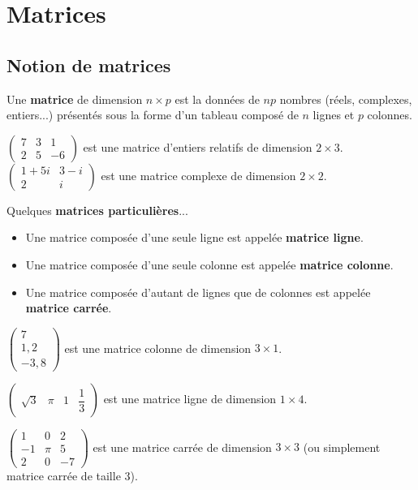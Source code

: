 \documentclass[11pt,fleqn]{book} %
\begin{document}
\chapter*{Matrices}

\section{Notion de matrices}

\begin{definition}Une \textbf{matrice} de dimension $n \times p$ est la données de $np$ nombres (réels, complexes, entiers...) présentés sous la forme d'un tableau composé de $n$ lignes et $p$ colonnes.\end{definition}

\begin{example} $\begin{pmatrix}7 & 3 & 1 \\ 2 & 5 &-6\end{pmatrix}$ est une matrice d'entiers relatifs de dimension $2 \times 3$. \\
$\begin{pmatrix}1+5i & 3-i \\ 2 & i \end{pmatrix}$ est une matrice complexe de dimension $2 \times 2$.\end{example}

\begin{definition}Quelques \textbf{matrices particulières}...

\begin{itemize}
\item Une matrice composée d'une seule ligne est appelée \textbf{matrice ligne}.
\item Une matrice composée d'une seule colonne est appelée \textbf{matrice colonne}.
\item Une matrice composée d'autant de lignes que de colonnes est appelée \textbf{matrice carrée}.
\end{itemize}

\end{definition}

\begin{example} $\begin{pmatrix}7 \\ 1,2 \\ -3,8\end{pmatrix}$ est une matrice colonne de dimension $3 \times 1$.

$\begin{pmatrix}\sqrt{3} & \pi & 1 & \dfrac{1}{3} \end{pmatrix}$ est une matrice ligne de dimension $1 \times 4$.

$\begin{pmatrix}1 & 0 & 2 \\ -1 & \pi  & 5 \\ 2 & 0 & -7 \end{pmatrix}$ est une matrice carrée de dimension $3 \times 3$ (ou simplement matrice carrée de taille 3).
\end{example}
\end{document}

